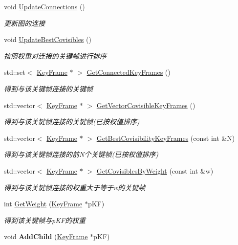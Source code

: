 \begin{DoxyCompactItemize}
\item 
void \hyperlink{classORB__SLAM2_1_1KeyFrame_afe7026956c91d4e0a01812be9dc7e8d5}{Update\-Connections} ()
\begin{DoxyCompactList}\small\item\em 更新图的连接 \end{DoxyCompactList}\item 
void \hyperlink{classORB__SLAM2_1_1KeyFrame_a09cb8502509c136536bf8d45793f8872}{Update\-Best\-Covisibles} ()
\begin{DoxyCompactList}\small\item\em 按照权重对连接的关键帧进行排序 \end{DoxyCompactList}\item 
std\-::set$<$ \hyperlink{classORB__SLAM2_1_1KeyFrame}{Key\-Frame} $\ast$ $>$ \hyperlink{classORB__SLAM2_1_1KeyFrame_af4ffdf4441477a36c42d6605c573f1cf}{Get\-Connected\-Key\-Frames} ()
\begin{DoxyCompactList}\small\item\em 得到与该关键帧连接的关键帧 \end{DoxyCompactList}\item 
std\-::vector$<$ \hyperlink{classORB__SLAM2_1_1KeyFrame}{Key\-Frame} $\ast$ $>$ \hyperlink{classORB__SLAM2_1_1KeyFrame_a9315d396634f6637f70f716336777b8d}{Get\-Vector\-Covisible\-Key\-Frames} ()
\begin{DoxyCompactList}\small\item\em 得到与该关键帧连接的关键帧(已按权值排序) \end{DoxyCompactList}\item 
std\-::vector$<$ \hyperlink{classORB__SLAM2_1_1KeyFrame}{Key\-Frame} $\ast$ $>$ \hyperlink{classORB__SLAM2_1_1KeyFrame_a2ecb2df01af804fb727c93948a28475f}{Get\-Best\-Covisibility\-Key\-Frames} (const int \&N)
\begin{DoxyCompactList}\small\item\em 得到与该关键帧连接的前\-N个关键帧(已按权值排序) \end{DoxyCompactList}\item 
std\-::vector$<$ \hyperlink{classORB__SLAM2_1_1KeyFrame}{Key\-Frame} $\ast$ $>$ \hyperlink{classORB__SLAM2_1_1KeyFrame_a7047bffbf130b00dd0270df99874f8a1}{Get\-Covisibles\-By\-Weight} (const int \&w)
\begin{DoxyCompactList}\small\item\em 得到与该关键帧连接的权重大于等于w的关键帧 \end{DoxyCompactList}\item 
int \hyperlink{classORB__SLAM2_1_1KeyFrame_ab10fd3aab6431face352a930961ff713}{Get\-Weight} (\hyperlink{classORB__SLAM2_1_1KeyFrame}{Key\-Frame} $\ast$p\-K\-F)
\begin{DoxyCompactList}\small\item\em 得到该关键帧与p\-K\-F的权重 \end{DoxyCompactList}\item 
\hypertarget{classORB__SLAM2_1_1KeyFrame_a2394adfb627d9cf87ed8da78f6b0d709}{void {\bfseries Add\-Child} (\hyperlink{classORB__SLAM2_1_1KeyFrame}{Key\-Frame} $\ast$p\-K\-F)}\label{classORB__SLAM2_1_1KeyFrame_a2394adfb627d9cf87ed8da78f6b0d709}


\end{DoxyCompactItemize}
